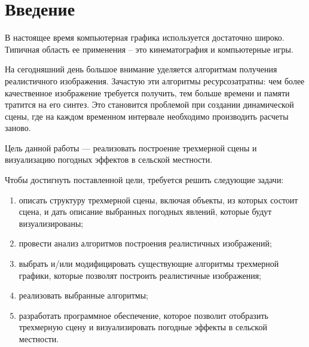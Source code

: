 \chapter*{Введение}

В настоящее время компьютерная графика используется достаточно широко. Типичная область ее применения – это кинематография и компьютерные игры. 

На сегодняшний день большое внимание уделяется алгоритмам получения реалистичного изображения. Зачастую эти алгоритмы ресурсозатратны: чем более
качественное изображение требуется получить, тем больше времени и памяти
тратится на его синтез. Это становится проблемой при создании динамической
сцены, где на каждом временном интервале необходимо производить расчеты
заново. 

Цель данной работы --- реализовать построение трехмерной сцены и 
визуализацию погодных эффектов в сельской местности.

Чтобы достигнуть поставленной цели, требуется решить следующие задачи:
\begin{enumerate}[label=\arabic*)]
	\item описать структуру трехмерной сцены, включая объекты, из которых состоит
	сцена, и дать описание выбранных погодных явлений, которые будут
	визуализированы;
	\item провести анализ алгоритмов построения реалистичных изображений;
	\item выбрать и/или модифицировать существующие алгоритмы трехмерной
	графики, которые позволят построить реалистичные изображения;
	\item реализовать выбранные алгоритмы;
	\item разработать программное обеспечение, которое позволит отобразить
	трехмерную сцену и визуализировать погодные эффекты в сельской местности.
\end{enumerate} 